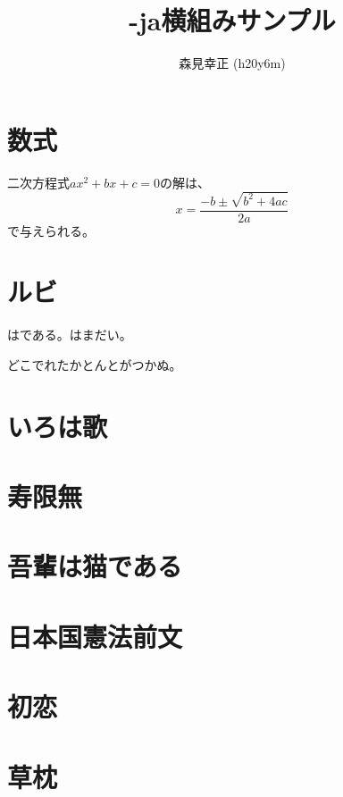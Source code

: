\documentclass[a4paper,twocolumn,tombow]{xltjarticle}
\title{\XeLaTeX-ja横組みサンプル}
\author{森見幸正 (h20y6m)}
\begin{document}
\maketitle

\section{数式}

二次方程式$ax^2+bx+c=0$の解は、
\[ x = \frac{-b\pm\sqrt{b^2+4ac}}{2a} \]
で与えられる。

\section{ルビ}

はである。はまだい。

どこでれたかとんとがつかぬ。

\section{いろは歌}

\section{寿限無}

\section{吾輩は猫である}

\section{日本国憲法前文}

\section{初恋}

\section{草枕}
\end{document}
